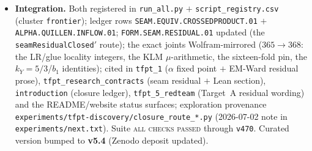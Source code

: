 \begin{itemize}
\texttt{SEAM.EQUIV.01}/S3) and $C{=}1$ ($U(1)$, feeds EM1) --- so closing R1$'$ feeds \emph{both}
named targets. \mO\ \emph{not closed}: the bridge lemma ``$\delta\log\det_\zeta(\mathrm{seam}){=}$
the inflow response'' stays the named cited step; \texttt{ALPHA.QUILLEN.EXACT.01} stays \mO;
$\ainv$ stays \mE.
\item \textbf{Integration.} Both registered in \texttt{run\_all.py} $+$
\texttt{script\_registry.csv} (cluster \texttt{frontier}); ledger rows
\texttt{SEAM.EQUIV.CROSSEDPRODUCT.01} $+$ \texttt{ALPHA.QUILLEN.INFLOW.01};
\texttt{FORM.SEAM.RESIDUAL.01} updated (the \texttt{seamResidualClosed$'$} route); the exact joints
Wolfram-mirrored ($365\to368$: the LR/glue locality integers, the KLM $\mu$-arithmetic, the
sixteen-fold pin, the $k_Y{=}5/3$/$b_1$ identities); cited in \texttt{tfpt\_1} ($\alpha$ fixed point
$+$ EM-Ward residual prose), \texttt{tfpt\_research\_contracts} (seam residual $+$ Lean section),
\texttt{introduction} (closure ledger), \texttt{tfpt\_5\_redteam} (Target~A residual wording) and
the README/website status surfaces; exploration provenance
\texttt{experiments/tfpt-discovery/closure\_route\_*.py} (2026-07-02 note in
\texttt{experiments/next.txt}). Suite \textsc{all checks passed} through \texttt{v470}.
Curated version bumped to \textbf{v5.4} (Zenodo deposit updated).
\end{itemize}

